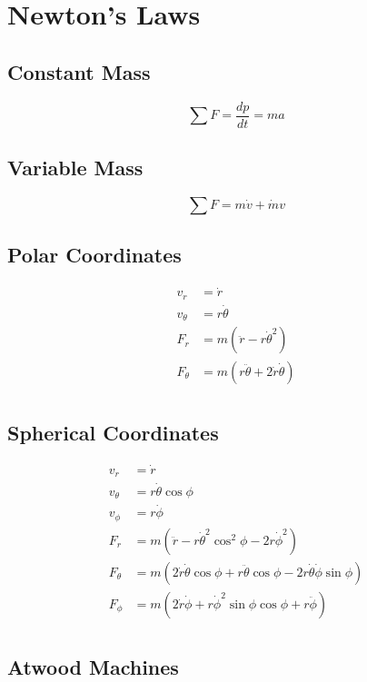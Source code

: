 \documentclass[12pt]{article}
\begin{document}
\section{Newton's Laws}
\subsection{Constant Mass}
$$
\sum F = \frac{dp}{dt} = ma
$$

\subsection{Variable Mass}
$$
\sum F = m \dot{v} + \dot{m} v
$$

\subsection{Polar Coordinates}
\begin{align*}
    v_r &= \dot{r} \\
    v_{\theta} &= r \dot{\theta} \\
    F_r &= m \left (\ddot{r} - r \dot{\theta}^2 \right) \\
    F_{\theta} & = m \left (r \ddot{\theta} + 2 \dot{r} \dot{\theta} \right) \\
\end{align*}

\subsection{Spherical Coordinates}

\begin{align*}
    v_r &= \dot{r} \\
    v_{\theta} &= r \dot{\theta} \cos{\phi} \\
    v_{\phi} &= r \dot{\phi} \\
    F_r &= m \left ( \ddot{r} - r \dot{\theta}^2 \cos^2 {\phi} - 2 r \dot{\phi}^2  \right) \\
    F_{\theta} &= m \left (2 \dot{r} \dot{\theta} \cos{\phi} + r \ddot{\theta} \cos{\phi} - 2 r \dot{\theta} \dot{\phi} \sin{\phi} \right) \\
    F_{\phi} &= m \left (2 \dot{r} \dot{\phi} + r \dot{\phi}^2 \sin{\phi} \cos{\phi} + r \ddot{\phi} \right) \\
\end{align*}

\subsection{Atwood Machines}
\end{document}
